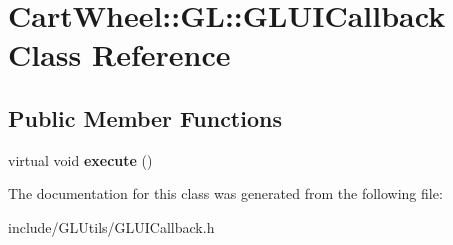 \hypertarget{classCartWheel_1_1GL_1_1GLUICallback}{
\section{CartWheel::GL::GLUICallback Class Reference}
\label{classCartWheel_1_1GL_1_1GLUICallback}
}
\subsection*{Public Member Functions}
\begin{DoxyCompactItemize}
\item 
\hypertarget{classCartWheel_1_1GL_1_1GLUICallback_aac498b01372ecc520185216343fc7cf3}{
virtual void {\bfseries execute} ()}
\label{classCartWheel_1_1GL_1_1GLUICallback_aac498b01372ecc520185216343fc7cf3}

\end{DoxyCompactItemize}


The documentation for this class was generated from the following file:\begin{DoxyCompactItemize}
\item 
include/GLUtils/GLUICallback.h\end{DoxyCompactItemize}
